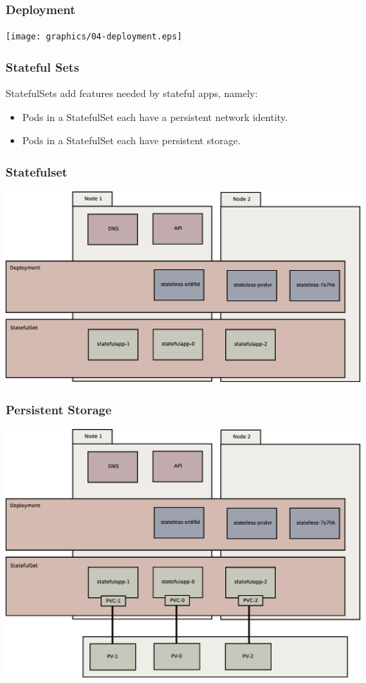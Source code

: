 \documentclass{beamer}
\begin{document}
\begin{frame}
    \frametitle{Deployment}
    \texttt{[image: graphics/04-deployment.eps]}
\end{frame}

\begin{frame}
    \frametitle{Stateful Sets}
    StatefulSets add features needed by stateful apps, namely:
    \begin{itemize}
        \item Pods in a StatefulSet each have a persistent network identity.
        \item Pods in a StatefulSet each have persistent storage.
    \end{itemize}
\end{frame}

\begin{frame}
    \frametitle{Statefulset}
    \includegraphics[width=\textwidth,height=0.85\textheight,keepaspectratio]{graphics/05-statefulSet.eps}
\end{frame}

\begin{frame}
    \frametitle{Persistent Storage}
    \includegraphics[width=\textwidth,height=0.85\textheight,keepaspectratio]{graphics/06-persistence.eps}
\end{frame}
\end{document}
